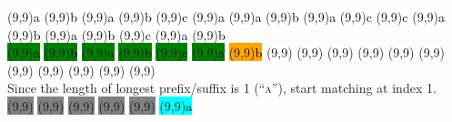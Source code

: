 \begin{center}
  \colorbox{white}{\makebox(9,9){\textcolor{black}{a}}}
  \colorbox{white}{\makebox(9,9){\textcolor{black}{b}}}
  \colorbox{white}{\makebox(9,9){\textcolor{black}{a}}}
  \colorbox{white}{\makebox(9,9){\textcolor{black}{b}}}
  \colorbox{white}{\makebox(9,9){\textcolor{black}{c}}}
  \colorbox{white}{\makebox(9,9){\textcolor{black}{a}}}
  \colorbox{white}{\makebox(9,9){\textcolor{black}{a}}}
  \colorbox{white}{\makebox(9,9){\textcolor{black}{b}}}
  \colorbox{white}{\makebox(9,9){\textcolor{black}{a}}}
  \colorbox{white}{\makebox(9,9){\textcolor{black}{c}}}
  \colorbox{white}{\makebox(9,9){\textcolor{black}{c}}}
  \colorbox{white}{\makebox(9,9){\textcolor{black}{a}}}
  \colorbox{white}{\makebox(9,9){\textcolor{black}{b}}}
  \colorbox{white}{\makebox(9,9){\textcolor{black}{a}}}
  \colorbox{white}{\makebox(9,9){\textcolor{black}{b}}}
  \colorbox{white}{\makebox(9,9){\textcolor{black}{c}}}
  \colorbox{white}{\makebox(9,9){\textcolor{black}{a}}}
  \colorbox{white}{\makebox(9,9){\textcolor{black}{b}}}
  \\
  \colorbox{green}{\makebox(9,9){\textcolor{black}{a}}}
  \colorbox{green}{\makebox(9,9){\textcolor{black}{b}}}
  \colorbox{green}{\makebox(9,9){\textcolor{black}{a}}}
  \colorbox{green}{\makebox(9,9){\textcolor{black}{b}}}
  \colorbox{green}{\makebox(9,9){\textcolor{black}{c}}}
  \colorbox{green}{\makebox(9,9){\textcolor{black}{a}}}
  \colorbox{orange}{\makebox(9,9){\textcolor{black}{b}}}
  \colorbox{white}{\makebox(9,9){\textcolor{black}{}}}
  \colorbox{white}{\makebox(9,9){\textcolor{black}{}}}
  \colorbox{white}{\makebox(9,9){\textcolor{black}{}}}
  \colorbox{white}{\makebox(9,9){\textcolor{black}{}}}
  \colorbox{white}{\makebox(9,9){\textcolor{black}{}}}
  \colorbox{white}{\makebox(9,9){\textcolor{black}{}}}
  \colorbox{white}{\makebox(9,9){\textcolor{black}{}}}
  \colorbox{white}{\makebox(9,9){\textcolor{black}{}}}
  \colorbox{white}{\makebox(9,9){\textcolor{black}{}}}
  \colorbox{white}{\makebox(9,9){\textcolor{black}{}}}
  \colorbox{white}{\makebox(9,9){\textcolor{black}{}}}
  \\
  Since the length of longest prefix/suffix is 1 (\textsc{``a''}), start matching at index 1.
  \\
  \colorbox{gray}{\makebox(9,9){\textcolor{black}{}}}
  \colorbox{gray}{\makebox(9,9){\textcolor{black}{}}}
  \colorbox{gray}{\makebox(9,9){\textcolor{black}{}}}
  \colorbox{gray}{\makebox(9,9){\textcolor{black}{}}}
  \colorbox{gray}{\makebox(9,9){\textcolor{black}{}}}
  \colorbox{cyan}{\makebox(9,9){\textcolor{black}{a}}}

\end{center}
